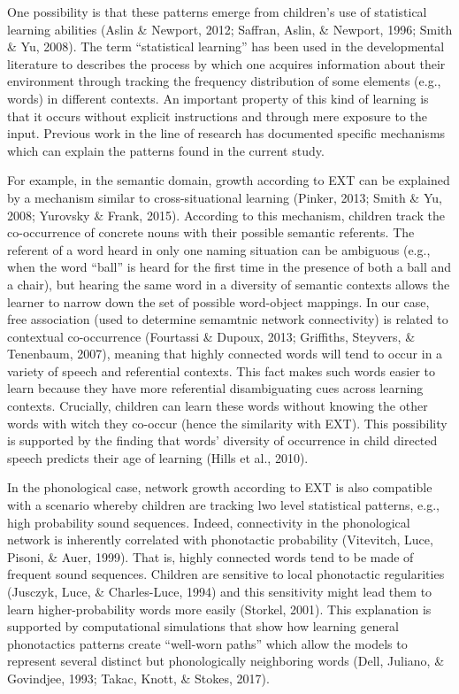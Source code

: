 \documentclass[english,floatsintext,man]{apa6}
\theoremstyle{definition}
\theoremstyle{definition}
\theoremstyle{definition}
\theoremstyle{remark}
\begin{document}
One possibility is that these patterns emerge from children's use of
statistical learning abilities (Aslin \& Newport, 2012; Saffran, Aslin,
\& Newport, 1996; Smith \& Yu, 2008). The term \enquote{statistical
learning} has been used in the developmental literature to describes the
process by which one acquires information about their environment
through tracking the frequency distribution of some elements (e.g.,
words) in different contexts. An important property of this kind of
learning is that it occurs without explicit instructions and through
mere exposure to the input. Previous work in the line of research has
documented specific mechanisms which can explain the patterns found in
the current study.

For example, in the semantic domain, growth according to EXT can be
explained by a mechanism similar to cross-situational learning (Pinker,
2013; Smith \& Yu, 2008; Yurovsky \& Frank, 2015). According to this
mechanism, children track the co-occurrence of concrete nouns with their
possible semantic referents. The referent of a word heard in only one
naming situation can be ambiguous (e.g., when the word \enquote{ball} is
heard for the first time in the presence of both a ball and a chair),
but hearing the same word in a diversity of semantic contexts allows the
learner to narrow down the set of possible word-object mappings. In our
case, free association (used to determine semamtnic network
connectivity) is related to contextual co-occurrence (Fourtassi \&
Dupoux, 2013; Griffiths, Steyvers, \& Tenenbaum, 2007), meaning that
highly connected words will tend to occur in a variety of speech and
referential contexts. This fact makes such words easier to learn because
they have more referential disambiguating cues across learning contexts.
Crucially, children can learn these words without knowing the other
words with witch they co-occur (hence the similarity with EXT). This
possibility is supported by the finding that words' diversity of
occurrence in child directed speech predicts their age of learning
(Hills et al., 2010).

In the phonological case, network growth according to EXT is also
compatible with a scenario whereby children are tracking lwo level
statistical patterns, e.g., high probability sound sequences. Indeed,
connectivity in the phonological network is inherently correlated with
phonotactic probability (Vitevitch, Luce, Pisoni, \& Auer, 1999). That
is, highly connected words tend to be made of frequent sound sequences.
Children are sensitive to local phonotactic regularities (Jusczyk, Luce,
\& Charles-Luce, 1994) and this sensitivity might lead them to learn
higher-probability words more easily (Storkel, 2001). This explanation
is supported by computational simulations that show how learning general
phonotactics patterns create ``well-worn paths'' which allow the models
to represent several distinct but phonologically neighboring words
(Dell, Juliano, \& Govindjee, 1993; Takac, Knott, \& Stokes, 2017).
\end{document}
